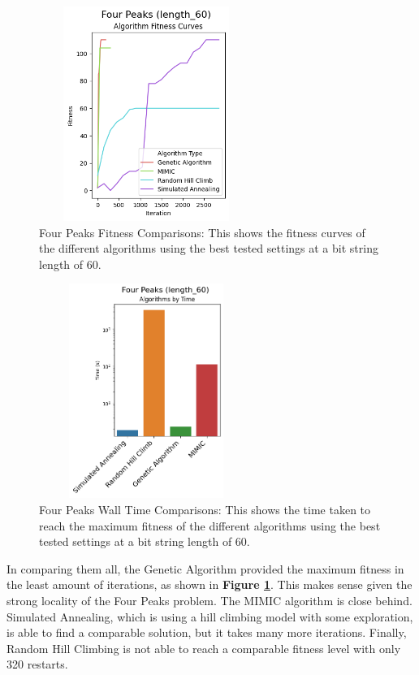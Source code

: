 \documentclass[letterpaper]{article} %
\begin{document}
\begin{figure}[!htb]
\centering
\includegraphics[width=2.75in, height=2.75in]{figures/Four_Peaks_length_60_Algorithm_Fitness_Curves_.png}
\caption{Four Peaks Fitness Comparisons: This shows the fitness curves of the different algorithms using the best tested settings at a bit string length of 60.  }
\label{fig:four_peaks_fitness_comparison_60}
\end{figure}

\begin{figure}[!htb]
\centering
\includegraphics[width=2.75in, height=2.75in]{figures/Four_Peaks_length_60_Algorithms_by_Time_.png}
\caption{Four Peaks Wall Time Comparisons: This shows the time taken to reach the maximum fitness of the different algorithms using the best tested settings at a bit string length of 60.  }
\label{fig:four_peaks_walltime_comparison_60}
\end{figure}

In comparing them all, the Genetic Algorithm provided the maximum fitness in the least amount of iterations, as shown in \textbf{Figure \ref{fig:four_peaks_fitness_comparison_60}}.  This makes sense given the strong locality of the Four Peaks problem.  The MIMIC algorithm is close behind.  Simulated Annealing, which is using a hill climbing model with some exploration, is able to find a comparable solution, but it takes many more iterations.  Finally, Random Hill Climbing is not able to reach a comparable fitness level with only 320 restarts.
\end{document}
